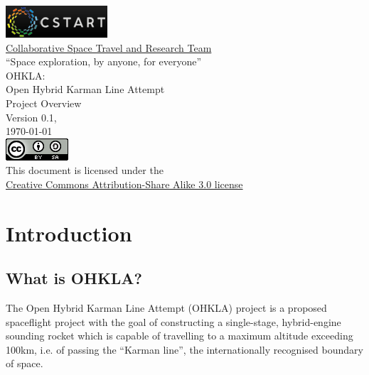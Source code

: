 \documentclass{report}
\begin{document}
\begin{titlepage}
\centering
\includegraphics{images/cstart_logo} \\
\Large{\href{http://www.cstart.org}{Collaborative Space Travel and Research Team}} \\
\vspace{0.5cm}
\large{``Space exploration, by anyone, for everyone''} \\
\vspace{4.0cm}
\Large{OHKLA:} \\
\Large{Open Hybrid Karman Line Attempt} \\
\Large{Project Overview} \\
\vspace{2.0cm}
\normalsize{Version 0.1, \\
\today} \\
\vspace{4.0cm}
\includegraphics{images/cc_badge} \\
This document is licensed under the \\
\href{http://creativecommons.org/licenses/by-sa/3.0/}{Creative Commons Attribution-Share Alike 3.0 license}
\end{titlepage}

\tableofcontents

\chapter{Introduction}

\section{What is OHKLA?}

The Open Hybrid Karman Line Attempt (OHKLA) project is a proposed spaceflight project with the goal of constructing a single-stage, hybrid-engine sounding rocket which is capable of travelling to a maximum altitude exceeding 100km, i.e. of passing the ``Karman line'', the internationally recognised boundary of space.
\end{document}
